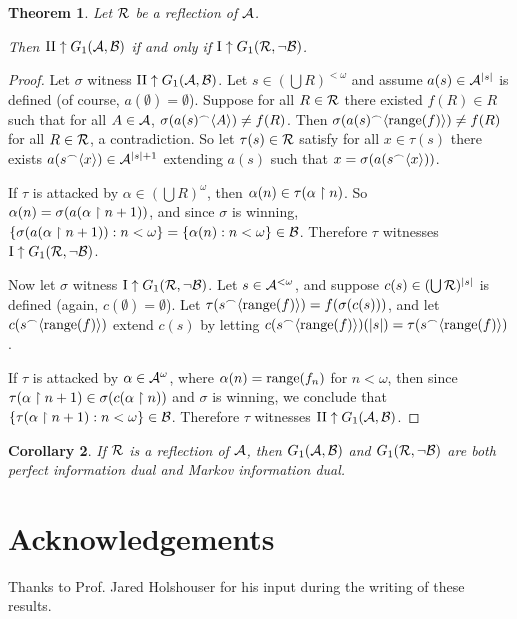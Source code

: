 \documentclass{amsart}
\theoremstyle{plain}
\newtheorem{theorem}{Theorem}
\newtheorem{corollary}[theorem]{Corollary}
\theoremstyle{definition}
\theoremstyle{remark}
\theoremstyle{plain}
\theoremstyle{definition}
\theoremstyle{remark}
\begin{document}
\begin{theorem}
  Let \(\mathcal{R}\) be a reflection of \(\mathcal{A}\). 

  Then
  \(\mathrm{II}\uparrow G_{1}(\mathcal{A},\mathcal{B})\) if and only if
  \(\mathrm{I}\uparrow G_{1}(\mathcal{R},\neg\mathcal{B})\).
\end{theorem}

\begin{proof}
  Let \(\sigma\) witness 
  \(\mathrm{II}\uparrow G_{1}(\mathcal{A},\mathcal{B})\).
  Let \(s\in(\bigcup R)^{<\omega}\) and assume \(a(s)\in\mathcal{A}^{|s|}\) is defined
  (of course, \(a(\emptyset)=\emptyset\)).
  Suppose for all \(R\in\mathcal{R}\) there existed \(f(R)\in R\) such that for all
  \(A\in\mathcal{A}\), \(\sigma(a(s){^\frown}\langle A\rangle)\not=f(R)\). Then 
  \(\sigma(a(s){^\frown}\langle\text{range}(f)\rangle)\not=f(R)\) for all \(R\in\mathcal{R}\), a contradiction.
  So let \(\tau(s)\in\mathcal{R}\) satisfy for all \(x\in\tau(s)\) there exists
  \(a(s{^\frown}\langle x\rangle)\in\mathcal{A}^{|s|+1}\) extending \(a(s)\) such that 
  \(x=\sigma(a(s{^\frown}\langle x\rangle))\).

  If \(\tau\) is attacked by \(\alpha\in(\bigcup R)^\omega\), then 
  \(\alpha(n)\in\tau(\alpha\restriction n)\). So \(\alpha(n)=\sigma(a(\alpha\restriction n+1))\),
  and since \(\sigma\) is winning, 
  \(\{\sigma(a(\alpha\restriction n+1)):n<\omega\}=\{\alpha(n):n<\omega\}\in\mathcal{B}\).
  Therefore \(\tau\) witnesses
  \(\mathrm{I}\uparrow G_{1}(\mathcal{R},\neg\mathcal{B})\).

  Now let \(\sigma\) witness
  \(\mathrm{I}\uparrow G_{1}(\mathcal{R},\neg\mathcal{B})\).
  Let \(s\in\mathcal{A}^{<\omega}\), and suppose \(c(s)\in(\bigcup \mathcal{R})^{|s|}\) is defined
  (again, \(c(\emptyset)=\emptyset\)). Let \(\tau(s{^\frown}\langle\text{range}(f)\rangle)=f(\sigma(c(s)))\),
  and let \(c(s{^\frown}\langle\text{range}(f)\rangle)\) extend \(c(s)\) by letting
  \(c(s{^\frown}\langle\text{range}(f)\rangle)(|s|)=\tau(s{^\frown}\langle\text{range}(f)\rangle)\).

  If \(\tau\) is attacked by \(\alpha\in\mathcal{A}^\omega\), where \(\alpha(n)=\text{range}(f_n)\)
  for \(n<\omega\), then since \(\tau(\alpha\restriction n+1)\in\sigma(c(\alpha\restriction n))\)
  and \(\sigma\) is winning, we conclude that 
  \(\{\tau(\alpha\restriction n+1):n<\omega\}\in\mathcal{B}\).
  Therefore \(\tau\) witnesses
  \(\mathrm{II}\uparrow G_{1}(\mathcal{A},\mathcal{B})\).
\end{proof}

\begin{corollary}
  If \(\mathcal{R}\) is a reflection of \(\mathcal{A}\),
  then \(G_{1}(\mathcal{A},\mathcal{B})\) and \(G_{1}(\mathcal{R},\neg\mathcal{B})\)
  are both perfect information dual and Markov information dual.
\end{corollary}

\section{Acknowledgements}

Thanks to Prof. Jared Holshouser for his input during the writing of these results.



\end{document}
